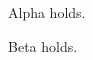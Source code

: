 \begin{theorem}\label{theo:alpha}
Alpha holds.
\end{theorem}
\begin{lemma}\label{lem:beta}
Beta holds.
\end{lemma}
